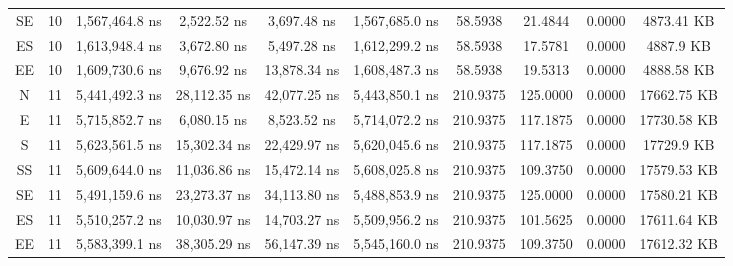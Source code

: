 \begin{sidewaystable}
\begin{tabular}{|c|c|c|c|c|c|c|c|c|c|}
        SE      &   10      &   1,567,464.8 ns        &   2,522.52 ns       &   3,697.48 ns           &   1,567,685.0 ns        &   58.5938     &   21.4844     &   0.0000      &   4873.41 KB       \\
        ES      &   10      &   1,613,948.4 ns        &   3,672.80 ns       &   5,497.28 ns           &   1,612,299.2 ns        &   58.5938     &   17.5781     &   0.0000      &   4887.9 KB        \\
        EE      &   10      &   1,609,730.6 ns        &   9,676.92 ns       &   13,878.34 ns          &   1,608,487.3 ns        &   58.5938     &   19.5313     &   0.0000      &   4888.58 KB       \\
        N       &   11      &   5,441,492.3 ns        &   28,112.35 ns      &   42,077.25 ns          &   5,443,850.1 ns        &   210.9375    &   125.0000    &   0.0000      &   17662.75 KB      \\
        E       &   11      &   5,715,852.7 ns        &   6,080.15 ns       &   8,523.52 ns           &   5,714,072.2 ns        &   210.9375    &   117.1875    &   0.0000      &   17730.58 KB      \\
        S       &   11      &   5,623,561.5 ns        &   15,302.34 ns      &   22,429.97 ns          &   5,620,045.6 ns        &   210.9375    &   117.1875    &   0.0000      &   17729.9 KB       \\
        SS      &   11      &   5,609,644.0 ns        &   11,036.86 ns      &   15,472.14 ns          &   5,608,025.8 ns        &   210.9375    &   109.3750    &   0.0000      &   17579.53 KB      \\
        SE      &   11      &   5,491,159.6 ns        &   23,273.37 ns      &   34,113.80 ns          &   5,488,853.9 ns        &   210.9375    &   125.0000    &   0.0000      &   17580.21 KB      \\
        ES      &   11      &   5,510,257.2 ns        &   10,030.97 ns      &   14,703.27 ns          &   5,509,956.2 ns        &   210.9375    &   101.5625    &   0.0000      &   17611.64 KB      \\
        EE      &   11      &   5,583,399.1 ns        &   38,305.29 ns      &   56,147.39 ns          &   5,545,160.0 ns        &   210.9375    &   109.3750    &   0.0000      &   17612.32 KB      \\
        \hline
    \end{tabular}
\end{sidewaystable}
